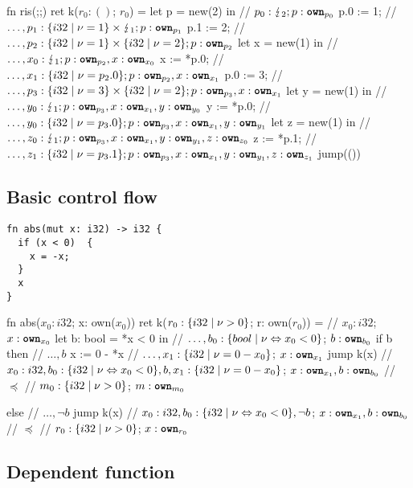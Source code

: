 \documentclass{article}
\begin{document}
\begin{lambdalr}
fn ris(;;) ret k($r_0: ()$; $r_0$) =
  let p = new(2) in   // $p_0: \lightning_2; p: \text{\ttfamily \bfseries own}_{p_0}$
  p.0 := 1;           // $\dots, p_1: \r{i32 | \nu = 1} \times \lightning_1; p: \own{p_1}$
  p.1 := 2;           // $\dots, p_2: \r{i32 | \nu = 1} \times \r{i32 | \nu = 2}; p: \own{p_2}$
  let x = new(1) in   // $\dots, x_0: \lightning_1; p: \text{\ttfamily \bfseries own}_{p_2}, x: \text{\ttfamily \bfseries own}_{x_0}$
  x := *p.0;          // $\dots, x_1: \r{i32 | \nu = p_2.0}; p: \own{p_2}, x: \own{x_1}$
  p.0 := 3;           // $\dots, p_3: \r{i32 | \nu = 3} \times \r{i32 | \nu = 2}; p: \own{p_3}, x:\own{x_1}$
  let y = new(1) in   // $\dots, y_0: \lightning_1; p: \text{\ttfamily \bfseries own}_{p_3}, x:\text{\ttfamily \bfseries own}_{x_1}, y: \text{\ttfamily \bfseries own}_{y_0}$
  y := *p.0;          // $\dots, y_0: \r{i32 | \nu = p_3.0}; p: \own{p_3}, x:\own{x_1}, y: \own{y_1}$
  let z = new(1) in   // $\dots, z_0: \lightning_1; p: \text{\ttfamily \bfseries own}_{p_3}, x:\text{\ttfamily \bfseries own}_{x_1}, y:\text{\ttfamily \bfseries own}_{y_1}, z:\text{\ttfamily \bfseries own}_{z_0}$
  z := *p.1;          // $\dots, z_1: \r{i32 | \nu = p_3.1}; p:\own{p_3}, x:\own{x_1}, y:\own{y_1}, z:\own{z_1}$
  jump(())
\end{lambdalr}

\subsection{Basic control flow}

\begin{verbatim}
fn abs(mut x: i32) -> i32 {
  if (x < 0)  {
    x = -x;
  }
  x
}
\end{verbatim}

\begin{lambdalr}
fn abs($x_0: i32$; x: own($x_0$)) ret k($r_0:\r{i32|\nu > 0}$; r: own($r_0$)) =
  // $x_0: i32$; $x: \text{\ttfamily \bfseries own}_{x_0}$
  let b: bool = *x < 0 in  // $\dots, b_0:\r{bool | \nu \Leftrightarrow x_0 < 0}$; $b:\text{\ttfamily \bfseries own}_{b_0}$
  if b then                // $\dots, b$
    x := 0 - *x            // $\dots, x_1: \r{i32 | \nu = 0 - x_0}$; $x: \text{\ttfamily \bfseries own}_{x_1}$
    jump k(x)
      // $x_0: i32, b_0:\r{i32 | \nu \Leftrightarrow x_0 < 0}, b, x_1:\r{i32 | \nu = 0-x_0}$; $x:\text{\ttfamily \bfseries own}_{x_1}, b:\text{\ttfamily \bfseries own}_{b_0}$
      // $\preceq$
      // $m_0:\r{i32 | \nu > 0}$; $m:\text{\ttfamily \bfseries own}_{m_0}$

  else  // $\dots, \neg b$
    jump k(x)
      // $x_0: i32, b_0:\r{i32 | \nu \Leftrightarrow x_0 < 0}, \neg b$; $x:\text{\ttfamily \bfseries own}_{x_1}, b:\text{\ttfamily \bfseries own}_{b_0}$
      // $\preceq$
      // $r_0:\r{i32 | \nu > 0}$; $x:\text{\ttfamily \bfseries own}_{r_0}$
\end{lambdalr}


\clearpage
\subsection{Dependent function}
\end{document}
